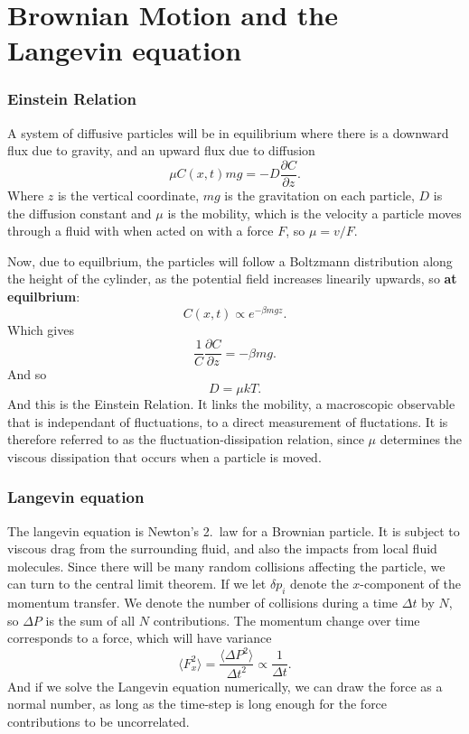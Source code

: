 \documentclass[a4paper, 11pt, notitlepage, english]{article}
\newcommand{\p}{\partial}
\begin{document}
\section*{Brownian Motion and the Langevin equation}

\subsubsection*{Einstein Relation}
A system of diffusive particles will be in equilibrium where there is a downward flux due to gravity, and an upward flux due to diffusion
$$\mu C(x,t) mg = - D \frac{\p C}{\p z}.$$
Where $z$ is the vertical coordinate, $mg$ is the gravitation on each particle, $D$ is the diffusion constant and $\mu$ is the mobility, which is the velocity a particle moves through a fluid with when acted on with a force $F$, so $\mu = v/F$.

Now, due to equilbrium, the particles will follow a Boltzmann distribution along the height of the cylinder, as the potential field increases linearily upwards, so \textbf{at equilbrium}:
$$C(x, t) \propto e^{-\beta mg z}.$$
Which gives
$$\frac{1}{C} \frac{\p C}{\p z} = -\beta m g.$$
And so
$$D = \mu k T.$$
And this is the Einstein Relation. It links the mobility, a macroscopic observable that is independant of fluctuations, to a direct measurement of fluctations. It is therefore referred to as the fluctuation-dissipation relation, since $\mu$ determines the viscous dissipation that occurs when a particle is moved.

\subsubsection*{Langevin equation}
The langevin equation is Newton's 2.\ law for a Brownian particle. It is subject to viscous drag from the surrounding fluid, and also the impacts from local fluid molecules. Since there will be many random collisions affecting the particle, we can turn to the central limit theorem. If we let $\delta p_i$ denote the $x$-component of the momentum transfer. We denote the number of collisions during a time $\Delta t$ by $N$, so $\Delta P$ is the sum of all $N$ contributions. The momentum change over time corresponds to a force, which will have variance
$$\langle F_x^2 \rangle = \frac{\langle \Delta P^2 \rangle}{\Delta t^2} \propto \frac{1}{\Delta t}.$$
And if we solve the Langevin equation numerically, we can draw the force as a normal number, as long as the time-step is long enough for the force contributions to be uncorrelated.
\end{document}
